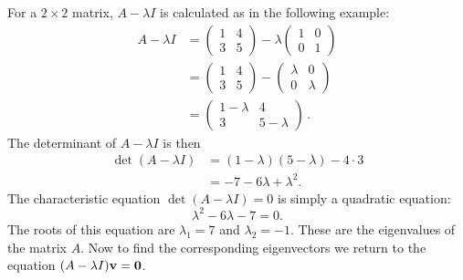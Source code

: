 For a $2 \times 2$ matrix, $A - \lambda I$ is calculated as in the following example:
\begin{equation*}
\begin{split}
 A - \lambda I &=  \left(\begin{array}{cc} 1 & 4 \\
                             3 & 5
                         \end{array} \right)
                  - \lambda  \left(\begin{array}{cc} 1 & 0 \\
                                                    0 & 1
                                   \end{array} \right) \\
               &=  \left(\begin{array}{cc} 1 & 4 \\
                                           3 & 5
                         \end{array} \right)
                  - \left(\begin{array}{cc} \lambda & 0 \\
                                           0 & \lambda
                         \end{array} \right) \\
               &= \left(\begin{array}{cc} 1 -\lambda & 4 \\
                                          3 & 5 - \lambda
                        \end{array} \right)
\,.
\end{split}
\end{equation*}
The determinant of $A - \lambda I$ is then
\begin{equation*}
\begin{split}
\det(A - \lambda I) &= (1 - \lambda)(5 - \lambda) - 4 \cdot 3 \\
                   &= -7 - 6 \lambda + \lambda^2 .
\end{split}
\end{equation*}
The characteristic equation $\det(A - \lambda I) = 0$ is simply a quadratic
equation:
\begin{equation*}
           \lambda^2 - 6 \lambda - 7 = 0.
\end{equation*}
The roots of this equation are $\lambda_1 = 7$ and $\lambda_2 = -1$.
These are the eigenvalues of the matrix $A$. Now to find the corresponding
eigenvectors we return to the equation $(A - \lambda I) \mathbf{v} = \mathbf{0}$.
